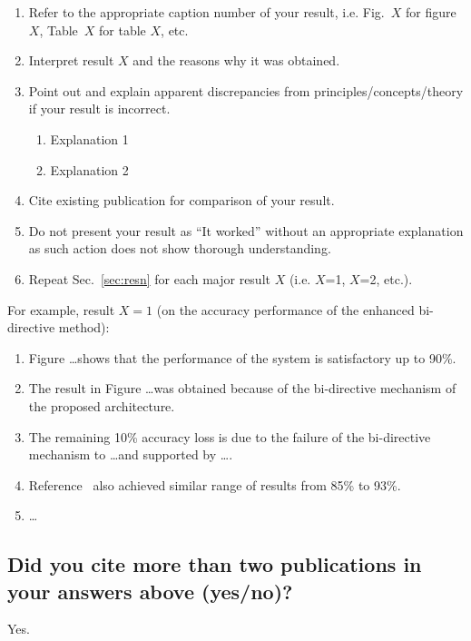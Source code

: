 		\begin{enumerate}		
		\item Refer to the appropriate caption number of your result, i.e. Fig.~$X$ for figure $X$, Table~$X$ for table $X$, etc.	
		\item Interpret result $X$ and the reasons why it was obtained. 
		
		\item Point out and explain apparent discrepancies from principles/concepts/theory if your result is incorrect.
		
		\begin{enumerate}
			\item Explanation 1
			
			\item Explanation 2
		\end{enumerate}
		
		\item Cite existing publication for comparison of your result.
		
		\item Do not present your result as ``It worked'' without an appropriate explanation as such action does not show thorough understanding.
	
						
		\item Repeat Sec.~\ref{sec:resn} for each major result $X$ (i.e. $X$=1, $X$=2, etc.).		
	\end{enumerate}

For example, result $X = 1$ (on the accuracy performance of the enhanced bi-directive method):

\begin{enumerate}
\item Figure \ldots shows that the performance of the system is satisfactory up to 90\%.
\item The result in Figure \ldots was obtained because of the bi-directive mechanism of the proposed architecture.
\item The remaining 10\% accuracy loss is due to the failure of the bi-directive mechanism to \ldots and supported by \ldots.
\item Reference~\cite{Einstein1905} also achieved similar range of results from 85\% to 93\%.
\item \ldots
\end{enumerate}
	
\subsection{Did you cite more than two publications in your answers above (yes/no)?}
Yes.	



















